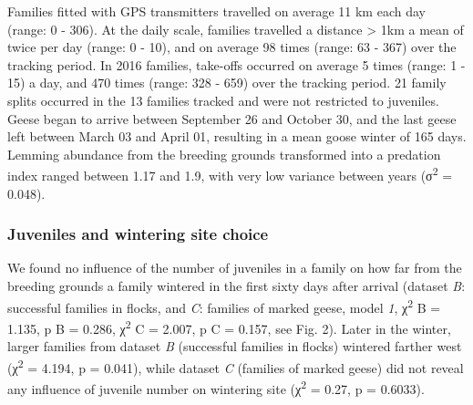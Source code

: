 \documentclass[10pt,twocolumn]{paper}
\begin{document}
Families fitted with GPS transmitters travelled on average 11 km each
day (range: 0 - 306). At the daily scale, families travelled a distance
\textgreater{} 1km a mean of twice per day (range: 0 - 10), and on
average 98 times (range: 63 - 367) over the tracking period. In 2016
families, take-offs occurred on average 5 times (range: 1 - 15) a day,
and 470 times (range: 328 - 659) over the tracking period. 21 family
splits occurred in the 13 families tracked and were not restricted to
juveniles. Geese began to arrive between September 26 and October 30,
and the last geese left between March 03 and April 01, resulting in a
mean goose winter of 165 days. Lemming abundance from the breeding
grounds transformed into a predation index ranged between 1.17 and 1.9,
with very low variance between years (σ\textsuperscript{2} = 0.048).

\subsubsection{Juveniles and wintering site
choice}\label{juveniles-and-wintering-site-choice}

We found no influence of the number of juveniles in a family on how far
from the breeding grounds a family wintered in the first sixty days
after arrival (dataset \emph{B}: successful families in flocks, and
\emph{C}: families of marked geese, model \emph{1}, χ\textsuperscript{2}
B = 1.135, p B = 0.286, χ\textsuperscript{2} C = 2.007, p C = 0.157, see
Fig. 2). Later in the winter, larger families from dataset \emph{B}
(successful families in flocks) wintered farther west
(χ\textsuperscript{2} = 4.194, p = 0.041), while dataset \emph{C}
(families of marked geese) did not reveal any influence of juvenile
number on wintering site (χ\textsuperscript{2} = 0.27, p = 0.6033).
\end{document}
